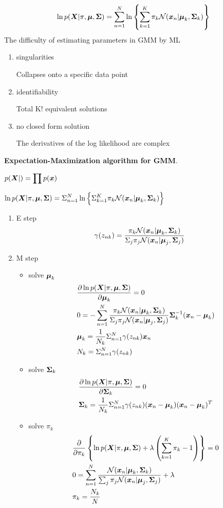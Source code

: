\documentclass[11pt]{article}
\begin{document}
\begin{equation*}
\ln p(\boldsymbol{X}|\pi,\boldsymbol{\mu},\boldsymbol{\Sigma})=\displaystyle\sum_{n=1}^N
\ln\left\{ \displaystyle\sum_{k=1}^K\pi_k\mathcal{N}(\boldsymbol{x}_n|\boldsymbol{\mu}_k,
\boldsymbol{\Sigma}_k)\right\}
\end{equation*}
The difficulty of estimating parameters in GMM by ML
\begin{enumerate}
\item singularities

Collapses onto a specific data point
\item identifiability

Total K! equivalent solutions
\item no closed form solution

The derivatives of the log likelihood are complex
\end{enumerate}

\textbf{Expectation-Maximization algorithm for GMM}. 


\(p(\boldsymbol{X}|)=\displaystyle\prod p(\boldsymbol{x})\)

\(\ln p(\boldsymbol{X}|\pi,\boldsymbol{\mu}, \boldsymbol{\Sigma})=\displaystyle\Sigma_{n=1}^N\ln\left\{
   \displaystyle\Sigma_{k=1}^K\pi_k\mathcal{N}(\boldsymbol{x}_n|\boldsymbol{\mu}_k,\boldsymbol{\Sigma}_k)\right\}\)
\begin{enumerate}
\item E step
\begin{equation*}
\gamma(z_{nk})=\frac{\pi_k\mathcal{N}(\boldsymbol{x}_n|\boldsymbol{\mu}_k,\boldsymbol{\Sigma}_k)}
{\displaystyle\Sigma_j\pi_j\mathcal{N}(\boldsymbol{x}_n|\boldsymbol{\mu}_j,\boldsymbol{\Sigma}_j)}
\end{equation*}
\item M step
\begin{itemize}
\item solve \(\boldsymbol{\mu}_k\)
\begin{align*}
&\frac{\partial\ln p(\boldsymbol{X}|\pi,\boldsymbol{\mu},\boldsymbol{\Sigma})}{\partial\boldsymbol{\mu}_k}=0\\
&0=-\displaystyle\sum_{n=1}^N\frac{\pi_k\mathcal{N}(\boldsymbol{x}_n|\boldsymbol{\mu}_k,\boldsymbol{\Sigma}_k)}
{\displaystyle\Sigma_j\pi_j\mathcal{N}(\boldsymbol{x}_n|\boldsymbol{\mu}_j,\boldsymbol{\Sigma}_j)}\boldsymbol{\Sigma}_k^{-1}(\boldsymbol{x}_n-\boldsymbol{\mu}_k)\\
&\boldsymbol{\mu}_k=\frac{1}{N_k}\displaystyle\Sigma_{n=1}^N\gamma(z_{nk})\boldsymbol{x}_n\\
&N_k=\displaystyle\Sigma_{n=1}^N\gamma(z_{nk})
\end{align*}
\item solve \(\boldsymbol{\Sigma}_k\)
\begin{align*}
&\frac{\partial\ln p(\boldsymbol{X}|\pi,\boldsymbol{\mu},\boldsymbol{\Sigma})}{\partial\boldsymbol{\Sigma}_k}=0\\
&\boldsymbol{\Sigma}_k=\frac{1}{N_k}\displaystyle\Sigma_{n=1}^N\gamma(z_{nk})(\boldsymbol{x}_n-\boldsymbol{\mu}_k)(\boldsymbol{x}_n-\boldsymbol{\mu}_k)^T
\end{align*}
\item solve \(\pi_k\)
\begin{align*}
&\frac{\partial}{\partial\pi_k}\left\{\ln p(\boldsymbol{X}|\pi,\boldsymbol{\mu},\boldsymbol{\Sigma})
+\lambda\left (\displaystyle\sum_{k=1}^K\pi_k-1\right)\right\}=0\\
&0=\displaystyle\sum_{n=1}^N\frac{\mathcal{N}(\boldsymbol{x}_n|\boldsymbol{\mu}_k,\boldsymbol{\Sigma}_k)}
{\sum_j\pi_j\mathcal{N}(\boldsymbol{x}_n|\boldsymbol{\mu}_j,\boldsymbol{\Sigma}_j)}+\lambda\\
&\pi_k=\frac{N_k}{N}
\end{align*}
\end{itemize}
\end{enumerate}
\end{document}
